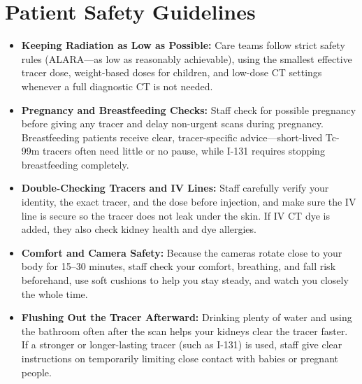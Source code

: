 \section{Patient Safety Guidelines}
\begin{itemize}
    \item \textbf{Keeping Radiation as Low as Possible:} Care teams follow strict safety rules (ALARA---as low as reasonably achievable), using the smallest effective tracer dose, weight-based doses for children, and low-dose CT settings whenever a full diagnostic CT is not needed.
    \item \textbf{Pregnancy and Breastfeeding Checks:} Staff check for possible pregnancy before giving any tracer and delay non-urgent scans during pregnancy. Breastfeeding patients receive clear, tracer-specific advice---short-lived Tc-99m tracers often need little or no pause, while I-131 requires stopping breastfeeding completely.
    \item \textbf{Double-Checking Tracers and IV Lines:} Staff carefully verify your identity, the exact tracer, and the dose before injection, and make sure the IV line is secure so the tracer does not leak under the skin. If IV CT dye is added, they also check kidney health and dye allergies.
    \item \textbf{Comfort and Camera Safety:} Because the cameras rotate close to your body for 15--30 minutes, staff check your comfort, breathing, and fall risk beforehand, use soft cushions to help you stay steady, and watch you closely the whole time.
    \item \textbf{Flushing Out the Tracer Afterward:} Drinking plenty of water and using the bathroom often after the scan helps your kidneys clear the tracer faster. If a stronger or longer-lasting tracer (such as I-131) is used, staff give clear instructions on temporarily limiting close contact with babies or pregnant people.
\end{itemize}

